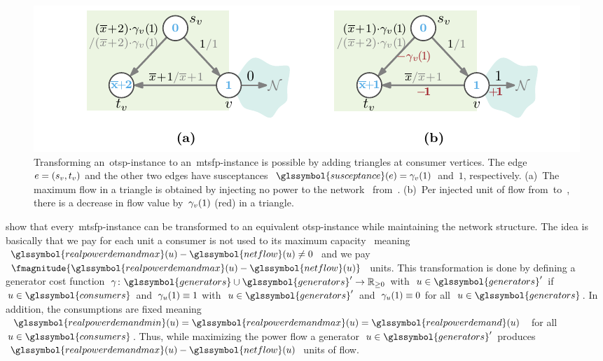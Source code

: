 \begin{figure}[t!]%
  \centering\includegraphics{switchplacement/figures/ots_mtsf_transformation.pdf}
  \caption[Transformation from an~\gls{otsp}- to an~\gls{mtsfp}-instance.]{
    Transforming an~\gls{otsp}-instance to an~\gls{mtsfp}-instance is
    possible by adding triangles at consumer vertices. The
    edge~$e=(s_v,t_v)$ and the other two edges have
    susceptances~$\glssymbol{susceptance}(\edge)=\cost_\vertex(1)$ and~$1$,
    respectively. (a)~The maximum flow in a triangle is obtained by injecting no
    power to the network~ from~\vertex. (b)~Per injected unit
    of flow from~\vertex to~, there is a decrease in flow
    value by~$\gamma_v(1)$ (\textcolor{KITred}{red}) in a triangle.}
  \label{fig:ots_mtsf_transformation}%
\end{figure}%
%
%
\textcite[Lemma 2]{Leh14} show that
every~\gls{mtsfp}-instance can be transformed to an equivalent
\gls{otsp}-instance while maintaining the network structure. The idea is
basically that we pay for each unit a consumer is not used to its maximum
capacity~
meaning~$\glssymbol{realpowerdemandmax}(\vertexa)-\glssymbol{netflow}
(\vertexa)\neq 0$ and we
pay~$\fmagnitude{\glssymbol{realpowerdemandmax}(\vertexa)-\glssymbol{netflow}
(\vertexa)}$ units. This transformation is done by defining a generator cost
function~$\gamma\colon\glssymbol{generators}\cup\glssymbol{generators}'\to\posreals$
with~$\vertexa\in\glssymbol{generators}'$ if~$\vertexa\in\glssymbol{consumers}$
and~$\gamma_u (1)\equiv 1$ with~$\vertexa\in\glssymbol{generators}'$
and~$\gamma_u(1)\equiv 0$ for all~$\vertexa\in\glssymbol{generators}$. In
addition, the consumptions are fixed
meaning~$\glssymbol{realpowerdemandmin}(\vertexa) =
\glssymbol{realpowerdemandmax}(\vertexa) =
\glssymbol{realpowerdemand}(\vertexa)$ for all~$\vertexa\in\glssymbol{consumers}$. Thus, while
maximizing the power flow a generator~$\vertexa\in\glssymbol{generators}'$
produces~$\glssymbol{realpowerdemandmax}(\vertexa)-\glssymbol{netflow}(\vertexa)$ units of
flow.

